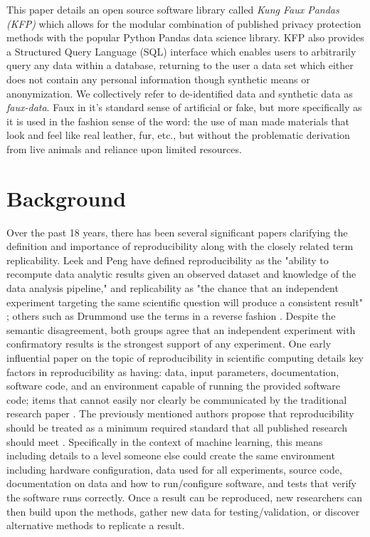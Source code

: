 \documentclass{article}
\begin{document}
This paper details an open source software library called \emph{Kung Faux Pandas (KFP)} which allows for the modular combination of published privacy protection methods with the popular Python Pandas data science library\cite{mckinney-proc-scipy-2010}. KFP also provides a Structured Query Language (SQL) interface which enables users to arbitrarily query any data within a database, returning to the user a data set which either does not contain any personal information though synthetic means or anonymization. We collectively refer to de-identified data and synthetic data as \emph{faux-data}. Faux in it's standard sense of artificial or fake, but more specifically as it is used in the fashion sense of the word: the use of man made materials that look and feel like real leather, fur, etc., but without the problematic derivation from live animals and reliance upon limited resources.

\section{Background}

 Over the past 18 years, there has been several significant papers clarifying the definition and importance of reproducibility along with the closely related term replicability. Leek and Peng have defined reproducibility as the "ability to recompute data analytic results given an observed dataset and knowledge of the data analysis pipeline," and replicability as "the chance that an independent experiment targeting the same scientific question will produce a consistent result" \cite{leek_opinion_2015}; others such as Drummond use the terms in a reverse fashion \cite{drummond_replicability_2009}. Despite the semantic disagreement, both groups agree that an independent experiment with confirmatory results is the strongest support of any experiment. One early influential paper on the topic of reproducibility in scientific computing details key factors in reproducibility as having: data, input parameters, documentation, software code, and an environment capable of running the provided software code; items that cannot easily nor clearly be communicated by the traditional research paper \cite{schwab_making_2000}. The previously mentioned authors propose that reproducibility should be treated as a minimum required standard that all published research should meet \cite{peng_reproducible_2006}. Specifically in the context of machine learning, this means including details to a level someone else could create the same environment including hardware configuration, data used for all experiments, source code, documentation on data and how to run/configure software, and tests that verify the software runs correctly. Once a result can be reproduced, new researchers can then build upon the methods, gather new data for testing/validation, or discover alternative methods to replicate a result.
\end{document}
